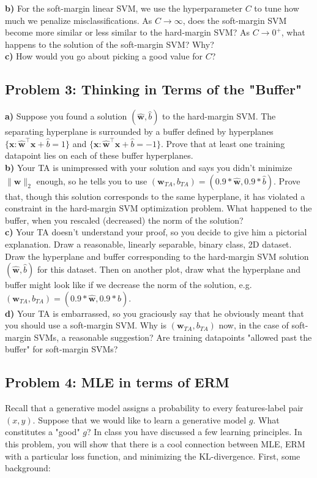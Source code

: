 \documentclass[a4paper]{article}
\begin{document}
\textbf{b)} For the soft-margin linear SVM, we use the hyperparameter $C$ to tune how much we penalize misclassifications. As $C\rightarrow\infty$, does the soft-margin SVM become more similar or less similar to the hard-margin SVM? As $C\rightarrow 0^+$, what happens to the solution of the soft-margin SVM? Why?\\

\textbf{c)} How would you go about picking a good value for $C$?

\subsection*{Problem 3: Thinking in Terms of the "Buffer"}
\textbf{a)} Suppose you found a solution $(\mathbf{\hat w},\hat b)$ to the hard-margin SVM. The separating hyperplane is surrounded by a buffer defined by hyperplanes $\{\mathbf{x}: \mathbf{\hat w}^\top\mathbf{x}+\hat b=1\}$ and $\{\mathbf{x}: \mathbf{\hat w}^\top\mathbf{x}+\hat b=-1\}$. Prove that at least one training datapoint lies on each of these buffer hyperplanes.\\

\textbf{b)} Your TA is unimpressed with your solution and says you didn't minimize $\|\mathbf{w}\|_2$ enough, so he tells you to use $(\mathbf{w}_{TA},b_{TA})=(0.9*\mathbf{\hat w},0.9*\hat b)$. Prove that, though this solution corresponds to the same hyperplane, it has violated a constraint in the hard-margin SVM optimization problem. What happened to the buffer, when you rescaled (decreased) the norm of the solution?\\

\textbf{c)} Your TA doesn't understand your proof, so you decide to give him a pictorial explanation. Draw a reasonable, linearly separable, binary class, 2D dataset. Draw the hyperplane and buffer corresponding to the hard-margin SVM solution $(\mathbf{\hat w},\hat b)$ for this dataset. Then on another plot, draw what the hyperplane and buffer might look like if we decrease the norm of the solution, e.g. $(\mathbf{w}_{TA},b_{TA})=(0.9*\mathbf{\hat w},0.9*\hat b)$.\\

\textbf{d)} Your TA is embarrassed, so you graciously say that he obviously meant that you should use a soft-margin SVM. Why is $(\mathbf{w}_{TA},b_{TA})$ now, in the case of soft-margin SVMs, a reasonable suggestion? Are training datapoints "allowed past the buffer" for soft-margin SVMs?

\subsection*{Problem 4: MLE in terms of ERM}
Recall that a generative model assigns a probability to every features-label pair $(x,y)$. Suppose that we would like to learn a generative model $g$. What constitutes a "good" $g$? In class you have discussed a few learning principles. In this problem, you will show that there is a cool connection between MLE, ERM with a particular loss function, and minimizing the KL-divergence. First, some background:\\
\end{document}
